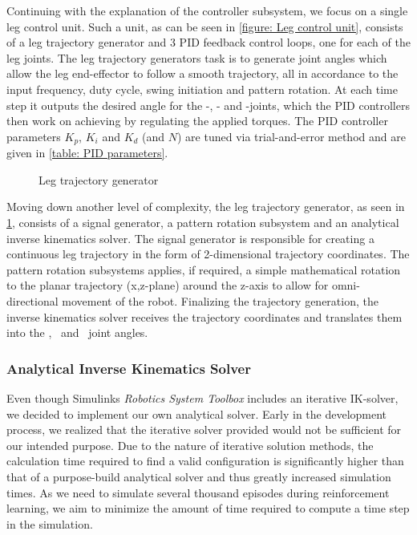 Continuing  with the explanation of the controller subsystem, we focus on a single leg control unit.
Such a unit, as can be seen in \ref{figure: Leg control unit}, consists of a leg trajectory generator and 3 PID feedback control loops, one for each of the leg joints.
The leg trajectory generators task is to generate joint angles which allow the leg end-effector to follow a smooth trajectory, all in accordance to the input frequency, duty cycle, swing initiation and pattern rotation.
At each time step it outputs the desired angle for the \textalpha-, \textbeta- and \textgamma-joints, which the PID controllers then work on achieving by regulating the applied torques.
The PID controller parameters $K_p$, $K_i$ and $K_d$ (and $N$) are tuned via trial-and-error method and are given in \ref{table: PID parameters}.

\begin{figure}
	\centerline{}
	\caption{Leg trajectory generator}
	\label{figure: Leg trajectory generator}
\end{figure}

Moving down another level of complexity, the leg trajectory generator, as seen in \ref{figure: Leg trajectory generator}, consists of a signal generator, a pattern rotation subsystem and an analytical inverse kinematics solver.
The signal generator is responsible for creating a continuous leg trajectory in the form of 2-dimensional trajectory coordinates.
The pattern rotation subsystems applies, if required, a simple mathematical rotation to  the planar trajectory (x,z-plane) around the z-axis to allow for omni-directional movement of the robot.
Finalizing the trajectory generation, the inverse kinematics solver receives the trajectory coordinates and translates them into the \textalpha, \textbeta \ and \textgamma \ joint angles.


\subsubsection{Analytical Inverse Kinematics Solver} \label{subsubsec: IK Solver}
Even though Simulinks \textit{Robotics System Toolbox} includes an iterative IK-solver, we decided to implement our own analytical solver.
Early in the development process, we realized that the iterative solver provided would not be sufficient for our intended purpose.
Due to the nature of iterative solution methods, the calculation time required to find a valid configuration is significantly higher than that of a purpose-build analytical solver and thus greatly increased simulation times.
As we need to simulate several thousand episodes during reinforcement learning, we aim to minimize the 
amount of time required to compute a time step in the simulation.


